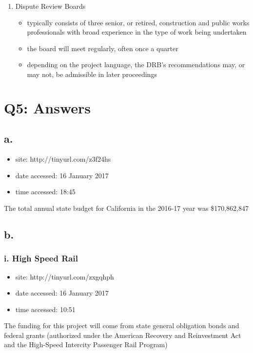 \documentclass[12pt]{article}
\renewcommand{\=}[1]{\stackrel{#1}{=}} %
\theoremstyle{definition}
\theoremstyle{remark}
\begin{document}
\begin{enumerate}
\begin{itemize}
	\end{itemize}
	\item Dispute Review Boards
	\begin{itemize}
		\item typically consists of three senior, or retired, construction and public works professionals with broad experience in the type of work being undertaken
		\item the board will meet regularly, often once a quarter
		\item depending on the project language, the DRB's recommendations may, or may not, be admissible in later proceedings
	\end{itemize}
\end{enumerate}


\section{Q5: Answers}

\subsection{a.}
\begin{itemize}
	\item site: {\small http://tinyurl.com/z3f24hs}
	\item date accessed: 16 January 2017
	\item time accessed: 18:45 
\end{itemize}
The total annual state budget for California in the 2016-17 year was \$170,862,847
\subsection{b.}

\subsubsection{i. High Speed Rail}
\begin{itemize}
	\item site: {\small http://tinyurl.com/zxgqhph}
	\item date accessed: 16 January 2017
	\item time accessed: 10:51
\end{itemize}

The funding for this project will come from state general obligation bonds and federal grants (authorized under the American Recovery and Reinvestment Act and the High-Speed Intercity Passenger Rail Program)
\end{document}
